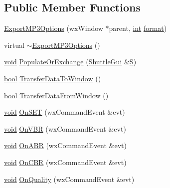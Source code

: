 \subsection*{Public Member Functions}
\begin{DoxyCompactItemize}
\item 
\hyperlink{class_export_m_p3_options_a3afb1cdc214403cedfb921d0971a7b7c}{Export\+M\+P3\+Options} (wx\+Window $\ast$parent, \hyperlink{xmltok_8h_a5a0d4a5641ce434f1d23533f2b2e6653}{int} \hyperlink{_export_p_c_m_8cpp_a317afff57d87a89158c2b038d37b2b08}{format})
\item 
virtual \hyperlink{class_export_m_p3_options_a529ecdc9a5d25b976cc1871ad1af5c89}{$\sim$\+Export\+M\+P3\+Options} ()
\item 
\hyperlink{sound_8c_ae35f5844602719cf66324f4de2a658b3}{void} \hyperlink{class_export_m_p3_options_a99e73c4b71c84b73ea87844df2c0b621}{Populate\+Or\+Exchange} (\hyperlink{class_shuttle_gui}{Shuttle\+Gui} \&\hyperlink{xlftab_8c_af933676109efed7ab34cea71d748a517}{S})
\item 
\hyperlink{mac_2config_2i386_2lib-src_2libsoxr_2soxr-config_8h_abb452686968e48b67397da5f97445f5b}{bool} \hyperlink{class_export_m_p3_options_ab9dd17d17282c4d8ba6de7dce119c666}{Transfer\+Data\+To\+Window} ()
\item 
\hyperlink{mac_2config_2i386_2lib-src_2libsoxr_2soxr-config_8h_abb452686968e48b67397da5f97445f5b}{bool} \hyperlink{class_export_m_p3_options_a10debc96423b92801d3c950c171674c0}{Transfer\+Data\+From\+Window} ()
\item 
\hyperlink{sound_8c_ae35f5844602719cf66324f4de2a658b3}{void} \hyperlink{class_export_m_p3_options_a8d7a47ab8d7876712b942705d1c6b7bf}{On\+S\+ET} (wx\+Command\+Event \&evt)
\item 
\hyperlink{sound_8c_ae35f5844602719cf66324f4de2a658b3}{void} \hyperlink{class_export_m_p3_options_a56e737650e5f0b3bc3b7bae5bb0f7ab5}{On\+V\+BR} (wx\+Command\+Event \&evt)
\item 
\hyperlink{sound_8c_ae35f5844602719cf66324f4de2a658b3}{void} \hyperlink{class_export_m_p3_options_a8b7124456f5ee1a1fd4d8482dffd7813}{On\+A\+BR} (wx\+Command\+Event \&evt)
\item 
\hyperlink{sound_8c_ae35f5844602719cf66324f4de2a658b3}{void} \hyperlink{class_export_m_p3_options_aa7164bf0df4c4ff49ec46e2a59f913a6}{On\+C\+BR} (wx\+Command\+Event \&evt)
\item 
\hyperlink{sound_8c_ae35f5844602719cf66324f4de2a658b3}{void} \hyperlink{class_export_m_p3_options_abd51fe7aa996bc064138fa68c7eb35da}{On\+Quality} (wx\+Command\+Event \&evt)

\end{DoxyCompactItemize}
